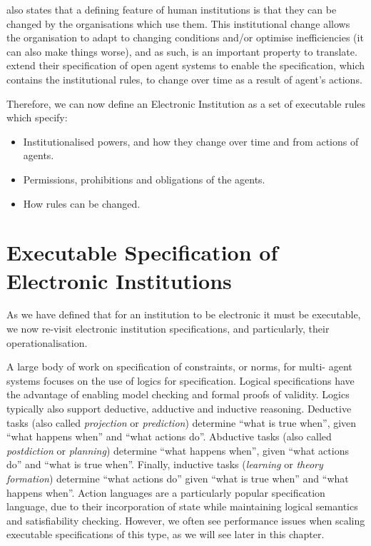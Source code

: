 \citet{North1990} also states that a defining feature of human institutions is
that they can be changed by the organisations which use them. This
institutional change allows the organisation to adapt to changing conditions
and/or optimise inefficiencies (it can also make things worse), and as such,
is an important property to translate. \citet{Artikis2011a} extend their
specification of open agent systems to enable the specification, which
contains the institutional rules, to change over time as a result of agent's
actions.

Therefore, we can now define an Electronic Institution as a set of executable
rules which specify:

\begin{itemize}
\item Institutionalised powers, and how they change over time
and from actions of agents. 
\item Permissions, prohibitions and obligations of
the agents.
\item How rules can be changed.
\end{itemize}

\section{Executable Specification of Electronic Institutions}

As we have defined that for an institution to be electronic it must be
executable, we now re-visit electronic institution specifications, and
particularly, their operationalisation. 

A large body of work on specification of constraints, or norms, for multi-
agent systems focuses on the use of logics for specification. Logical
specifications have the advantage of enabling model checking and formal proofs
of validity. Logics typically also support deductive, adductive and inductive
reasoning. Deductive tasks (also called \emph{projection} or
\emph{prediction}) determine ``what is true when'', given ``what happens
when'' and ``what actions do''. Abductive tasks (also called
\emph{postdiction} or \emph{planning}) determine ``what happens when'', given
``what actions do'' and ``what is true when''. Finally, inductive tasks
(\emph{learning} or \emph{theory formation}) determine ``what actions do''
given ``what is true when'' and ``what happens when''. Action languages are a
particularly popular specification language, due to their incorporation of
state while maintaining logical semantics and satisfiability checking.
However, we often see performance issues when scaling executable
specifications of this type, as we will see later in this chapter.

